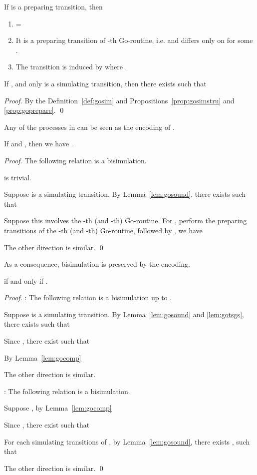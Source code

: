 \documentclass[runningheads, envcountsame, a4paper]{llncs}
\begin{document}
\begin{proposition}
  If  is a preparing transition, then
  \begin{enumerate} \setlength{\itemsep}{0ex}
    \item  = 
    \item It is a preparing transition of -th Go-routine, i.e.  and  differs only on  for some .
\item The transition is induced by  where .
  \end{enumerate}
  \label{prop:goprepare}
\end{proposition}

\begin{lemma}
  If , and only  is a simulating transition, then there exists  such that
  
  \label{lem:gosound}
\end{lemma}
\begin{proof}
  By the Definition~\ref{def:gosim} and Propositions~\ref{prop:gosimstru} and \ref{prop:goprepare}. \qed
\end{proof}

Any of the processes in  can be seen as the encoding of .
\begin{lemma}
  If  and , then we have .
  \label{lem:gotsgs}
\end{lemma}
\begin{proof}
  The following relation is a bisimulation.
  

   is trivial.

  Suppose  is a simulating transition. By Lemma~\ref{lem:gosound}, there exists  such that
  
  Suppose this  involves the -th (and -th) Go-routine. For , perform the preparing transitions of the -th (and -th) Go-routine, followed by , we have
  

  The other direction is similar. \qed
\end{proof}

As a consequence, bisimulation is preserved by the encoding.
\begin{theorem}
   if and only if .
  \label{thm:gofull}
\end{theorem}
\begin{proof}
  : The following relation is a bisimulation up to .
  
Suppose  is a simulating transition. By Lemma~\ref{lem:gosound} and \ref{lem:gotsgs}, there exists  such that
  
  Since , there exist  such that
  
  By Lemma~\ref{lem:gocomp}
  
  The other direction is similar.

  : The following relation is a bisimulation.
  
  Suppose , by Lemma~\ref{lem:gocomp}
  
  Since , there exist  such that
  
  For each simulating transitions of , by Lemma~\ref{lem:gosound}, there exists , such that
  
  The other direction is similar. \qed
\end{proof}
\end{document}
